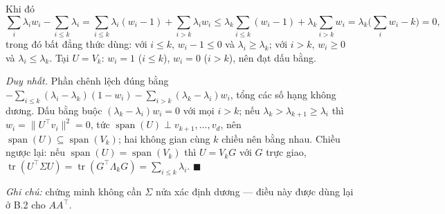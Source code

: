 Khi đó \[\sum_i\lambda_iw_i-\sum_{i\le k}\lambda_i=\sum_{i\le k}\lambda_i(w_i-1)+\sum_{i>k}\lambda_iw_i\le\lambda_k\sum_{i\le k}(w_i-1)+\lambda_k\sum_{i>k}w_i=\lambda_k\Big(\sum_iw_i-k\Big)=0,\] trong đó bất đẳng thức dùng: với \(i\le k\), \(w_i-1\le0\) và \(\lambda_i\ge\lambda_k\); với \(i>k\), \(w_i\ge0\) và \(\lambda_i\le\lambda_k\). Tại \(U=V_k\): \(w_i=1\) (\(i\le k\)), \(w_i=0\) (\(i>k\)), nên đạt dấu bằng.

\emph{Duy nhất.} Phần chênh lệch đúng bằng \(-\sum_{i\le k}(\lambda_i-\lambda_k)(1-w_i)-\sum_{i>k}(\lambda_k-\lambda_i)w_i\), tổng các số hạng không dương. Dấu bằng buộc \((\lambda_k-\lambda_i)w_i=0\) với mọi \(i>k\); nếu \(\lambda_k>\lambda_{k+1}\ge\lambda_i\) thì \(w_i=\|U^\top v_i\|^2=0\), tức \(\operatorname{span}(U)\perp v_{k+1},\dots,v_d\), nên \(\operatorname{span}(U)\subseteq\operatorname{span}(V_k)\); hai không gian cùng \(k\) chiều nên bằng nhau. Chiều ngược lại: nếu \(\operatorname{span}(U)=\operatorname{span}(V_k)\) thì \(U=V_kG\) với \(G\) trực giao, \(\operatorname{tr}(U^\top\Sigma U)=\operatorname{tr}(G^\top\Lambda_kG)=\sum_{i\le k}\lambda_i\). \(\blacksquare\)

\emph{Ghi chú:} chứng minh không cần \(\Sigma\) nửa xác định dương --- điều này được dùng lại ở B.2 cho \(AA^\top\).
